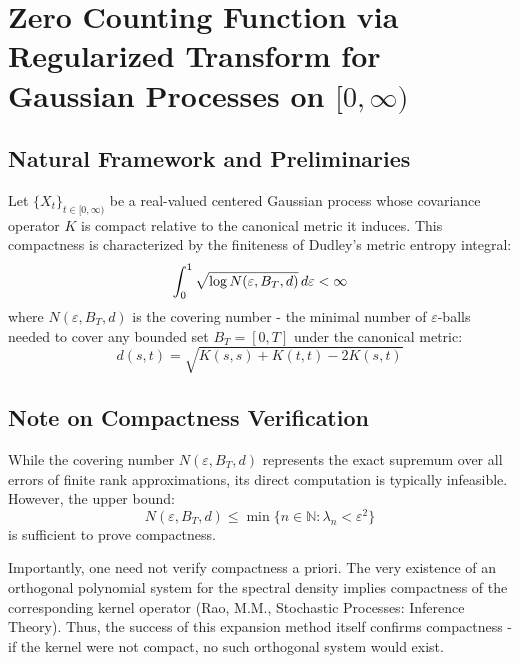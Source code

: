 \documentclass{article}
\begin{document}
{\tableofcontents}

\section{Zero Counting Function via Regularized Transform for Gaussian
Processes on $[0, \infty)$}

\subsection{Natural Framework and Preliminaries}

Let $\{X_t \}_{t \in [0, \infty)}$ be a real-valued centered Gaussian process
whose covariance operator $K$ is compact relative to the canonical metric it
induces. This compactness is characterized by the finiteness of Dudley's
metric entropy integral:
\begin{equation}
  \int_0^1 \sqrt{\log N (\varepsilon, B_T, d)}  \hspace{0.17em} d \varepsilon
  < \infty
\end{equation}
where $N (\varepsilon, B_T, d)$ is the covering number - the minimal number of
$\varepsilon$-balls needed to cover any bounded set $B_T = [0, T]$ under the
canonical metric:
\begin{equation}
  d (s, t) = \sqrt{K (s, s) + K (t, t) - 2 K (s, t)}
\end{equation}

\subsection{Note on Compactness Verification}

While the covering number $N (\varepsilon, B_T, d)$ represents the exact
supremum over all errors of finite rank approximations, its direct computation
is typically infeasible. However, the upper bound:
\begin{equation}
  N (\varepsilon, B_T, d) \leq \min \{n \in \mathbb{N}: \lambda_n <
  \varepsilon^2 \}
\end{equation}
is sufficient to prove compactness.

Importantly, one need not verify compactness a priori. The very existence of
an orthogonal polynomial system for the spectral density implies compactness
of the corresponding kernel operator (Rao, M.M., Stochastic Processes:
Inference Theory). Thus, the success of this expansion method itself confirms
compactness - if the kernel were not compact, no such orthogonal system would
exist.
\end{document}
